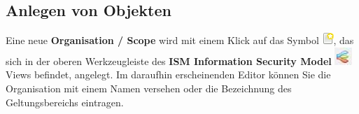 \documentclass[a4paper,10pt]{book}
\begin{document}
\subsection{Anlegen von Objekten} \label{Anlegen von Objekten}
Eine neue \textbf{Organisation / Scope} wird mit einem Klick auf das Symbol \includegraphics[height=2ex]{Icon/Oeffnen.png},
das sich in der oberen Werkzeugleiste des \textbf{ISM Information Security Model} \includegraphics[height=2ex]{Icon/Informationssicherheitsmodell.png} Views befindet, angelegt.
Im daraufhin erscheinenden Editor können Sie die Organisation mit einem Namen versehen oder die Bezeichnung des Geltungsbereichs eintragen.
\end{document}

